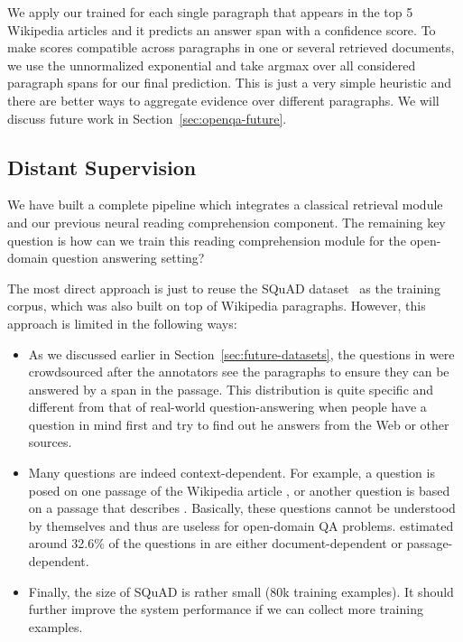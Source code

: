 We apply our trained  for each single paragraph that appears in the top 5 Wikipedia articles and it predicts an answer span with a confidence score. To make scores compatible across paragraphs in one or several retrieved documents, we use the unnormalized exponential and take argmax over all considered paragraph spans for our final prediction. This is just a very simple heuristic and there are better ways to aggregate evidence over different paragraphs. We will discuss future work in Section~\ref{sec:openqa-future}.

\subsection{Distant Supervision}
We have built a complete pipeline which integrates a classical retrieval module and our previous neural reading comprehension component. The remaining key question is how can we train this reading comprehension module for the open-domain question answering setting?

The most direct approach is just to reuse the SQuAD dataset~\cite{rajpurkar2016squad} as the training corpus, which was also built on top of Wikipedia paragraphs. However, this approach is limited in the following ways:

\begin{itemize}
    \item
        As we discussed earlier in Section~\ref{sec:future-datasets}, the questions in  were crowdsourced after the annotators see the paragraphs to ensure they can be answered by a span in the passage. This distribution is quite specific and different from that of real-world question-answering when people have a question in mind first and try to find out he answers from the Web or other sources.
    \item
        Many  questions are indeed context-dependent. For example, a question is  posed on one passage of the Wikipedia article , or another question is  based on a passage that describes . Basically, these questions cannot be understood by themselves and thus are useless for open-domain QA problems.  estimated around 32.6\% of the questions in  are either document-dependent or passage-dependent.
    \item
        Finally, the size of SQuAD is rather small (80k training examples). It should further improve the system performance if we can collect more training examples.
\end{itemize}


